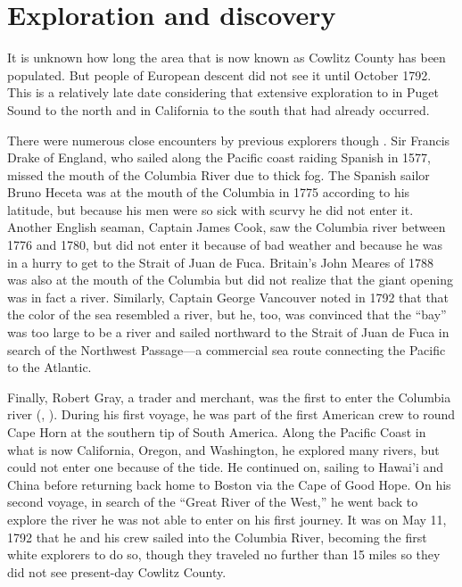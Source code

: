 \section{Exploration and discovery}
\label{sec:exploration_discovery}

It is unknown how long the area that is now known as Cowlitz County has been populated. But people of European descent did not see it until October 1792. This is a relatively late date considering that extensive exploration to in Puget Sound to the north and in California to the south that had already occurred.

There were numerous close encounters by previous explorers though \citep[cf.][15-16]{urrutia_1998}. Sir Francis Drake of England, who sailed along the Pacific coast raiding Spanish in 1577, missed the mouth of the Columbia River due to thick fog. The Spanish sailor Bruno Heceta was at the mouth of the Columbia in 1775 according to his latitude, but because his men were so sick with scurvy he did not enter it. Another English seaman, Captain James Cook, saw the Columbia river between 1776 and 1780, but did not enter it because of bad weather and because he was in a hurry to get to the Strait of Juan de Fuca. Britain's John Meares of 1788 was also at the mouth of the Columbia but did not realize that the giant opening was in fact a river. Similarly, Captain George Vancouver noted in 1792 that that the color of the sea resembled a river, but he, too, was convinced that the “bay” was too large to be a river \citep[3]{olson_1948} and sailed northward to the Strait of Juan de Fuca in search of the Northwest Passage—a commercial sea route connecting the Pacific to the Atlantic.

Finally, Robert Gray, a trader and merchant, was the first to enter the Columbia river (\citealt[16]{urrutia_1998}, \citealt[3]{olson_1948}). During his first voyage, he was part of the first American crew to round Cape Horn at the southern tip of South America. Along the Pacific Coast in what is now California, Oregon, and Washington, he explored many rivers, but could not enter one because of the tide. He continued on, sailing to Hawai'i and China before returning back home to Boston via the Cape of Good Hope. On his second voyage, in search of the “Great River of the West,” he went back to explore the river he was not able to enter on his first journey. It was on May 11, 1792 that he and his crew sailed into the Columbia River, becoming the first white explorers to do so, though they traveled no further than 15 miles so they did not see present-day Cowlitz County.

